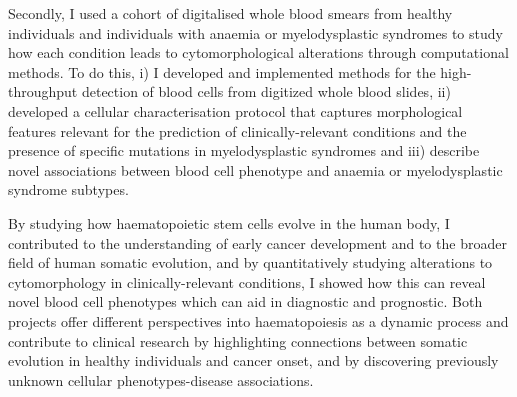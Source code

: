 Secondly, I used a cohort of digitalised whole blood smears from healthy individuals and individuals with anaemia or myelodysplastic syndromes to study how each condition leads to cytomorphological alterations through computational methods. To do this, i) I developed and implemented methods for the high-throughput detection of blood cells from digitized whole blood slides, ii) developed a cellular characterisation protocol that captures morphological features relevant for the prediction of clinically-relevant conditions and the presence of specific mutations in myelodysplastic syndromes and iii) describe novel associations between blood cell phenotype and anaemia or myelodysplastic syndrome subtypes.

By studying how haematopoietic stem cells evolve in the human body, I contributed to the understanding of early cancer development and to the broader field of human somatic evolution, and by quantitatively studying alterations to cytomorphology in clinically-relevant conditions, I showed how this can reveal novel blood cell phenotypes which can aid in diagnostic and prognostic. Both projects offer different perspectives into haematopoiesis as a dynamic process and contribute to clinical research by highlighting connections between somatic evolution in healthy individuals and cancer onset, and by discovering previously unknown cellular phenotypes-disease associations.
